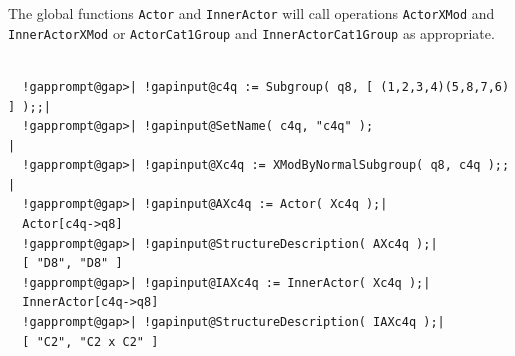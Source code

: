 \documentclass[a4paper,11pt]{report}
\begin{document}
{{{ The global functions \texttt{Actor} and \texttt{InnerActor} will call operations \texttt{ActorXMod} and \texttt{InnerActorXMod} or \texttt{ActorCat1Group} and \texttt{InnerActorCat1Group} as appropriate. }

 

 
\begin{Verbatim}[commandchars=!@|,fontsize=\small,frame=single,label=Example]
  
  !gapprompt@gap>| !gapinput@c4q := Subgroup( q8, [ (1,2,3,4)(5,8,7,6) ] );;|
  !gapprompt@gap>| !gapinput@SetName( c4q, "c4q" );                         |
  !gapprompt@gap>| !gapinput@Xc4q := XModByNormalSubgroup( q8, c4q );;      |
  !gapprompt@gap>| !gapinput@AXc4q := Actor( Xc4q );|
  Actor[c4q->q8]
  !gapprompt@gap>| !gapinput@StructureDescription( AXc4q );|
  [ "D8", "D8" ]
  !gapprompt@gap>| !gapinput@IAXc4q := InnerActor( Xc4q );|
  InnerActor[c4q->q8]
  !gapprompt@gap>| !gapinput@StructureDescription( IAXc4q );|
  [ "C2", "C2 x C2" ]
  
\end{Verbatim}
 }

 }

         
\end{document}
